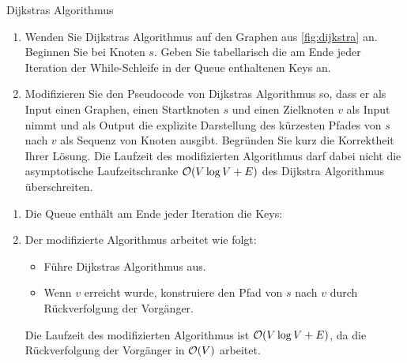 \documentclass{article}
\begin{document}
\begin{exercise}{Dijkstras Algorithmus}{}
  \begin{enumerate}
    \item Wenden Sie Dijkstras Algorithmus auf den Graphen aus \ref{fig:dijkstra} an. Beginnen Sie bei Knoten $s$. Geben Sie tabellarisch die am Ende jeder Iteration der While-Schleife in der Queue enthaltenen Keys an.
    \item Modifizieren Sie den Pseudocode von Dijkstras Algorithmus so, dass er als Input einen Graphen, einen Startknoten $s$ und einen Zielknoten $v$ als Input nimmt und als Output die explizite Darstellung des kürzesten Pfades von $s$ nach $v$ als Sequenz von Knoten ausgibt. Begründen Sie kurz die Korrektheit Ihrer Lösung. Die Laufzeit des modifizierten Algorithmus darf dabei nicht die asymptotische Laufzeitschranke $\mathcal{O}(V \log V + E)$ des Dijkstra Algorithmus überschreiten.
  \end{enumerate}

  \begin{solution}
    \begin{enumerate}
      \item Die Queue enthält am Ende jeder Iteration die Keys: 
      \item Der modifizierte Algorithmus arbeitet wie folgt: \begin{itemize}
              \item Führe Dijkstras Algorithmus aus.
              \item Wenn $v$ erreicht wurde, konstruiere den Pfad von $s$ nach $v$ durch Rückverfolgung der Vorgänger.
            \end{itemize}
            Die Laufzeit des modifizierten Algorithmus ist $\mathcal{O}(V \log V + E)$, da die Rückverfolgung der Vorgänger in $\mathcal{O}(V)$ arbeitet.
    \end{enumerate}
  \end{solution}
\end{exercise}
\end{document}

